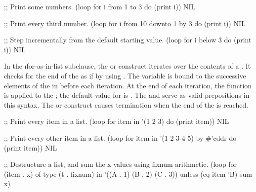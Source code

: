 

\code
;; Print some numbers.
 (loop for i from 1 to 3
       do (print i))
\EV NIL
 
;; Print every third number.
 (loop for i from 10 downto 1 by 3
       do (print i))
\EV NIL
 
;; Step incrementally from the default starting value.
 (loop for i below 3
       do (print i))
\EV NIL
\endcode
 
\endsubsubsubsubsection%

\endsubsubsubsection%


In the \i{for-as-in-list} subclause,
the  
or  construct iterates over the contents of a 
.  It checks for 
the end of the  as if by using .  
The variable  is bound to the successive elements  of 
the  in  before each
iteration.  At the end of each iteration, the function 
is applied to the ; the default value for  is
.
The   and  serve as valid prepositions in
this syntax.
The  or  construct causes termination when the
end of the  is reached.


\code
;; Print every item in a list.
 (loop for item in '(1 2 3) do (print item))
\EV NIL
 
;; Print every other item in a list.
 (loop for item in '(1 2 3 4 5) by #'cddr
       do (print item))
\EV NIL
 
;; Destructure a list, and sum the x values using fixnum arithmetic.
 (loop for (item . x) of-type (t . fixnum) in '((A . 1) (B . 2) (C . 3))
       unless (eq item 'B) sum x)
\endcode
{}
 
\endsubsubsubsubsection%

